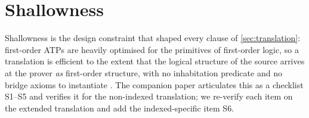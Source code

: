 \section{Shallowness}
\label{sec:shallow}

Shallowness is the design constraint that shaped every clause of
\cref{sec:translation}: first-order ATPs are heavily optimised for the
primitives of first-order logic, so a translation is efficient to the
extent that the logical structure of the source arrives at the prover
\emph{as} first-order structure, with no inhabitation predicate and no
bridge axioms to instantiate \cite[\S 1.1]{Czajka2018}.  The companion
paper articulates this as a checklist S1--S5 and verifies it for the
non-indexed translation; we re-verify each item on the extended
translation and add the indexed-specific item S6.

